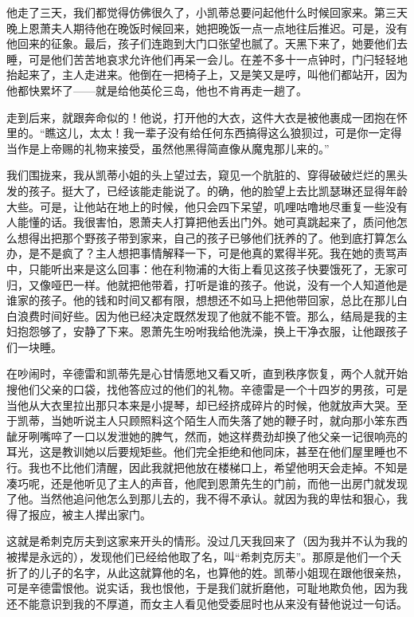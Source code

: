 \par 他走了三天，我们都觉得仿佛很久了，小凯蒂总要问起他什么时候回家来。第三天晚上恩萧夫人期待他在晚饭时候回来，她把晚饭一点一点地往后推迟。可是，没有他回来的征象。最后，孩子们连跑到大门口张望也腻了。天黑下来了，她要他们去睡，可是他们苦苦地哀求允许他们再呆一会儿。在差不多十一点钟时，门闩轻轻地抬起来了，主人走进来。他倒在一把椅子上，又是笑又是哼，叫他们都站开，因为他都快累坏了——就是给他英伦三岛，他也不肯再走一趟了。
\par 走到后来，就跟奔命似的！他说，打开他的大衣，这件大衣是被他裹成一团抱在怀里的。“瞧这儿，太太！我一辈子没有给任何东西搞得这么狼狈过，可是你一定得当作是上帝赐的礼物来接受，虽然他黑得简直像从魔鬼那儿来的。”
\par 我们围拢来，我从凯蒂小姐的头上望过去，窥见一个肮脏的、穿得破破烂烂的黑头发的孩子。挺大了，已经该能走能说了。的确，他的脸望上去比凯瑟琳还显得年龄大些。可是，让他站在地上的时候，他只会四下呆望，叽哩咕噜地尽重复一些没有人能懂的话。我很害怕，恩萧夫人打算把他丢出门外。她可真跳起来了，质问他怎么想得出把那个野孩子带到家来，自己的孩子已够他们抚养的了。他到底打算怎么办，是不是疯了？主人想把事情解释一下，可是他真的累得半死。我在她的责骂声中，只能听出来是这么回事：他在利物浦的大街上看见这孩子快要饿死了，无家可归，又像哑巴一样。他就把他带着，打听是谁的孩子。他说，没有一个人知道他是谁家的孩子。他的钱和时间又都有限，想想还不如马上把他带回家，总比在那儿白白浪费时间好些。因为他已经决定既然发现了他就不能不管。那么，结局是我的主妇抱怨够了，安静了下来。恩萧先生吩咐我给他洗澡，换上干净衣服，让他跟孩子们一块睡。
\par 在吵闹时，辛德雷和凯蒂先是心甘情愿地又看又听，直到秩序恢复，两个人就开始搜他们父亲的口袋，找他答应过的他们的礼物。辛德雷是一个十四岁的男孩，可是当他从大衣里拉出那只本来是小提琴，却已经挤成碎片的时候，他就放声大哭。至于凯蒂，当她听说主人只顾照料这个陌生人而失落了她的鞭子时，就向那小笨东西龇牙咧嘴啐了一口以发泄她的脾气，然而，她这样费劲却换了他父亲一记很响亮的耳光，这是教训她以后要规矩些。他们完全拒绝和他同床，甚至在他们屋里睡也不行。我也不比他们清醒，因此我就把他放在楼梯口上，希望他明天会走掉。不知是凑巧呢，还是他听见了主人的声音，他爬到恩萧先生的门前，而他一出房门就发现了他。当然他追问他怎么到那儿去的，我不得不承认。就因为我的卑怯和狠心，我得了报应，被主人撵出家门。
\par 这就是希刺克厉夫到这家来开头的情形。没过几天我回来了（因为我并不认为我的被撵是永远的），发现他们已经给他取了名，叫“希刺克厉夫”。那原是他们一个夭折了的儿子的名字，从此这就算他的名，也算他的姓。凯蒂小姐现在跟他很亲热，可是辛德雷恨他。说实话，我也恨他，于是我们就折磨他，可耻地欺负他，因为我还不能意识到我的不厚道，而女主人看见他受委屈时也从来没有替他说过一句话。
